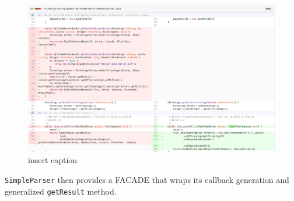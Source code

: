 \begin{figure}[H]
	\centering
	\includegraphics[width=\linewidth]{code97}
	\caption{insert caption}
\end{figure}

\texttt{SimpleParser} then provides a FACADE that wraps its callback generation and generalized \texttt{getResult} method.


